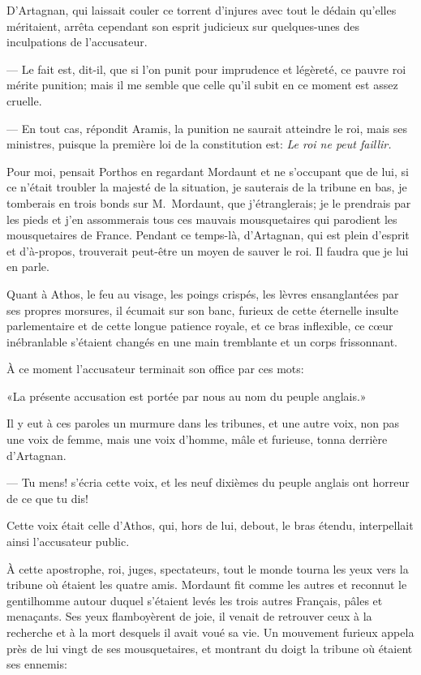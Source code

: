 D'Artagnan, qui laissait couler ce torrent d'injures avec tout le dédain qu'elles méritaient, arrêta cependant son esprit judicieux sur quelques-unes des inculpations de l'accusateur.

— Le fait est, dit-il, que si l'on punit pour imprudence et légèreté, ce pauvre roi mérite punition; mais il me semble que celle qu'il subit en ce moment est assez cruelle.

— En tout cas, répondit Aramis, la punition ne saurait atteindre le roi, mais ses ministres, puisque la première loi de la constitution est: \textit{Le roi ne peut faillir.}

Pour moi, pensait Porthos en regardant Mordaunt et ne s'occupant que de lui, si ce n'était troubler la majesté de la situation, je sauterais de la tribune en bas, je tomberais en trois bonds sur M.~Mordaunt, que j'étranglerais; je le prendrais par les pieds et j'en assommerais tous ces mauvais mousquetaires qui parodient les mousquetaires de France. Pendant ce temps-là, d'Artagnan, qui est plein d'esprit et d'à-propos, trouverait peut-être un moyen de sauver le roi. Il faudra que je lui en parle.


Quant à Athos, le feu au visage, les poings crispés, les lèvres ensanglantées par ses propres morsures, il écumait sur son banc, furieux de cette éternelle insulte parlementaire et de cette longue patience royale, et ce bras inflexible, ce cœur inébranlable s'étaient changés en une main tremblante et un corps frissonnant.

À ce moment l'accusateur terminait son office par ces mots:

«La présente accusation est portée par nous au nom du peuple anglais.»

Il y eut à ces paroles un murmure dans les tribunes, et une autre voix, non pas une voix de femme, mais une voix d'homme, mâle et furieuse, tonna derrière d'Artagnan.

— Tu mens! s'écria cette voix, et les neuf dixièmes du peuple anglais ont horreur de ce que tu dis!

Cette voix était celle d'Athos, qui, hors de lui, debout, le bras étendu, interpellait ainsi l'accusateur public.

À cette apostrophe, roi, juges, spectateurs, tout le monde tourna les yeux vers la tribune où étaient les quatre amis. Mordaunt fit comme les autres et reconnut le gentilhomme autour duquel s'étaient levés les trois autres Français, pâles et menaçants. Ses yeux flamboyèrent de joie, il venait de retrouver ceux à la recherche et à la mort desquels il avait voué sa vie. Un mouvement furieux appela près de lui vingt de ses mousquetaires, et montrant du doigt la tribune où étaient ses ennemis:

